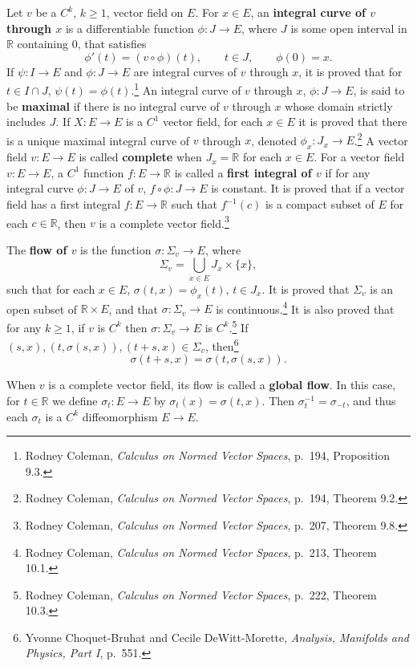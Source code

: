 \documentclass{article}
\theoremstyle{definition}
\theoremstyle{definition}
\begin{document}
Let $v$ be a $C^k$, $k \geq 1$, vector field on $E$.
For $x \in E$, an \textbf{integral curve of $v$ through $x$} is a differentiable function $\phi:J \to E$,
where $J$ is some open interval in $\mathbb{R}$ containing $0$, that satisfies
\[
\phi'(t) = (v \circ \phi)(t), \qquad t \in J, \qquad \phi(0)=x.
\]
If $\psi:I \to E$ and $\phi:J \to E$ are integral curves of $v$ through $x$, it is proved that 
for $t \in I \cap J$, $\psi(t)=\phi(t)$.\footnote{Rodney Coleman, {\em Calculus on Normed Vector Spaces}, p.~194, Proposition 9.3.}
An integral curve of $v$ through $x$, $\phi:J \to E$, is said to be \textbf{maximal} if
there is no integral curve of $v$ through $x$ whose domain strictly includes $J$. 
If $X:E \to E$ is a $C^1$ vector field,  for each $x \in E$ it is proved that there is a unique maximal integral curve of $v$ through $x$, denoted
$\phi_x:J_x \to E$.\footnote{Rodney Coleman, {\em Calculus on Normed Vector Spaces}, p.~194, Theorem 9.2.}
A vector field $v:E \to E$ is called \textbf{complete} when $J_x=\mathbb{R}$ for each $x \in E$. 
For a vector field $v:E \to E$, a $C^1$ function $f:E \to \mathbb{R}$ is called a \textbf{first integral of $v$} if
for any integral curve $\phi:J \to E$ of $v$, $f \circ \phi:J \to E$ is constant. 
It is proved that if a vector field has a first integral $f:E \to \mathbb{R}$ such that
$f^{-1}(c)$ is a compact subset of $E$ for each $c \in \mathbb{R}$, then
$v$ is a complete vector field.\footnote{Rodney Coleman, {\em Calculus on Normed Vector Spaces}, p.~207, Theorem 9.8.}

The \textbf{flow of $v$} is the function $\sigma:\Sigma_v \to E$, where
\[
\Sigma_v=\bigcup_{x \in E} J_x \times \{x\},
\]
such that for each $x \in E$, 
$\sigma(t,x)=\phi_x(t)$, $t \in J_x$.
It is proved that $\Sigma_v$ is an open subset of $\mathbb{R} \times E$, and that $\sigma:\Sigma_v \to E$ is continuous.\footnote{Rodney Coleman, {\em Calculus on Normed Vector Spaces}, p.~213, Theorem 10.1.}
It is also proved that for any $k \geq 1$, if $v$ is $C^k$ then
$\sigma:\Sigma_v \to E$ is $C^k$.\footnote{Rodney Coleman, {\em Calculus on Normed Vector Spaces}, p.~222, Theorem 10.3.}
If $(s,x),(t,\sigma(s,x)),(t+s,x) \in \Sigma_v$, then\footnote{Yvonne Choquet-Bruhat and Cecile DeWitt-Morette, {\em Analysis, Manifolds and Physics, Part I}, p.~551.}
\[
\sigma(t+s,x) = \sigma(t,\sigma(s,x)).
\]

When $v$ is a complete vector field, its flow is called a \textbf{global flow}. 
In this case, for $t \in \mathbb{R}$ we define $\sigma_t:E \to E$ by $\sigma_t(x)=\sigma(t,x)$. 
Then $\sigma_t^{-1}=\sigma_{-t}$, and thus each $\sigma_t$ is a $C^k$ diffeomorphism $E \to E$. 
\end{document}
